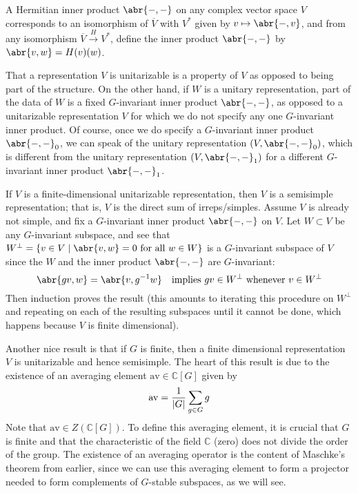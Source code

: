 \documentclass[11pt,leqno]{article}
\theoremstyle{plain}
\theoremstyle{definition}
\numberwithin{equation}{section}
\numberwithin{lem}{section}
\newcommand{\av}{\mathrm{av}}
\begin{document}
A Hermitian inner product $\abr{-,-}$ on any complex vector space $V$ corresponds to an isomorphism of $\overline V$ with $V^\ast$ given by $v\mapsto \abr{-,v}$, and from any isomorphism $\overline V\xrightarrow{H} V^\ast$, define the inner product $\abr{-,-}$ by $\abr{v,w} = H(v)(w)$.

That a representation $V$ is unitarizable is a property of $V$ as opposed to being part of the structure. On the other hand, if $W$ is a unitary representation, part of the data of $W$ is a fixed $G$-invariant inner product $\abr{-,-}$, as opposed to a unitarizable representation $V$ for which we do not specify any one $G$-invariant inner product. Of course, once we do specify a $G$-invariant inner product $\abr{-,-}_0$, we can speak of the unitary representation $(V,\abr{-,-}_0)$, which is different from the unitary representation $(V,\abr{-,-}_1)$ for a different $G$-invariant inner product $\abr{-,-}_1$.

If $V$ is a finite-dimensional unitarizable representation, then $V$ is a semisimple representation; that is, $V$ is the direct sum of irreps/simples. Assume $V$ is already not simple, and fix a $G$-invariant inner product $\abr{-,-}$ on $V$. Let $W\subset V$ be any $G$-invariant subspace, and see that $W^\perp = \{v\in V\mid \abr{v,w} = 0\text{ for all }w\in W\}$ is a $G$-invariant subspace of $V$ since the $W$ and the inner product $\abr{-,-}$ are $G$-invariant:
\[\abr{gv,w} = \abr{v,g^{-1}w}\quad\text{implies $gv\in W^\perp$ whenever $v\in W^\perp$}\]
Then induction proves the result (this amounts to iterating this procedure on $W^\perp$ and repeating on each of the resulting subspaces until it cannot be done, which happens because $V$ is finite dimensional).

Another nice result is that if $G$ is finite, then a finite dimensional representation $V$ is unitarizable and hence semisimple. The heart of this result is due to the existence of an averaging element $\av\in\mathbb C[G]$ given by
\[\av = \frac{1}{\abs{G}}\sum_{g\in G}g\]
Note that $\av\in Z(\mathbb C[G])$. To define this averaging element, it is crucial that $G$ is finite and that the characteristic of the field $\mathbb C$ (zero) does not divide the order of the group. The existence of an averaging operator is the content of Maschke's theorem from earlier, since we can use this averaging element to form a projector needed to form complements of $G$-stable subspaces, as we will see. 
\end{document}
